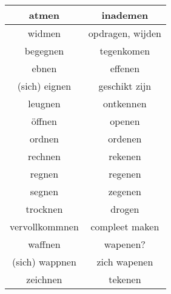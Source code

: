 \documentclass[main.tex]{subfiles}
\begin{document}
\begin{tabular}{|c|c|}
\hline 
atmen & inademen \\ 
\hline 
widmen & opdragen, wijden \\ 
\hline 
begegnen & tegenkomen \\ 
\hline 
ebnen & effenen \\ 
\hline 
(sich) eignen & geschikt zijn \\ 
\hline 
leugnen & ontkennen \\ 
\hline 
öffnen & openen \\ 
\hline 
ordnen & ordenen \\ 
\hline 
rechnen & rekenen \\ 
\hline 
regnen & regenen \\ 
\hline 
segnen & zegenen \\ 
\hline 
trocknen & drogen \\ 
\hline 
vervollkommnen & compleet maken \\ 
\hline 
waffnen & wapenen? \\ 
\hline 
(sich) wappnen & zich wapenen \\ 
\hline 
zeichnen & tekenen \\ 
\hline 
\end{tabular} 
\end{document}

